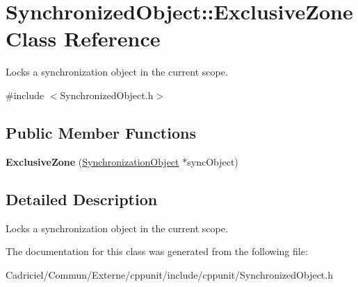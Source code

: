 \hypertarget{class_synchronized_object_1_1_exclusive_zone}{}\section{Synchronized\+Object\+:\+:Exclusive\+Zone Class Reference}
\label{class_synchronized_object_1_1_exclusive_zone}


Locks a synchronization object in the current scope.  




{\ttfamily \#include $<$Synchronized\+Object.\+h$>$}

\subsection*{Public Member Functions}
\begin{DoxyCompactItemize}
\item 
{\bfseries Exclusive\+Zone} (\hyperlink{class_synchronized_object_1_1_synchronization_object}{Synchronization\+Object} $\ast$sync\+Object)\hypertarget{class_synchronized_object_1_1_exclusive_zone_ae4393b508828328c2f4816ff9b7b090c}{}\label{class_synchronized_object_1_1_exclusive_zone_ae4393b508828328c2f4816ff9b7b090c}

\end{DoxyCompactItemize}


\subsection{Detailed Description}
Locks a synchronization object in the current scope. 

The documentation for this class was generated from the following file\+:\begin{DoxyCompactItemize}
\item 
Cadriciel/\+Commun/\+Externe/cppunit/include/cppunit/Synchronized\+Object.\+h\end{DoxyCompactItemize}
